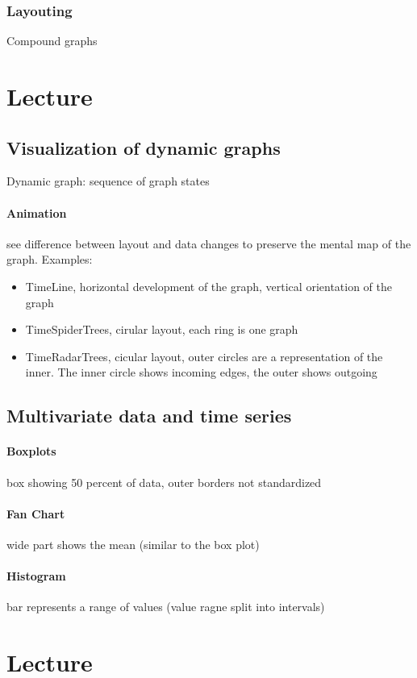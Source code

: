 \documentclass[10pt,a4paper]{article}
\begin{document}
	\subsubsection*{Layouting}
	Compound graphs
	
	\section{Lecture}
	\subsection{Visualization of dynamic graphs}
	Dynamic graph: sequence of graph states
	\paragraph{Animation} see difference between layout and data changes to preserve the mental map of the graph. Examples:
	\begin{itemize}
		\item TimeLine, horizontal development of the graph, vertical orientation of the graph  
		\item TimeSpiderTrees, cirular layout, each ring is one graph
		\item TimeRadarTrees, cicular layout, outer circles are a representation of the inner. The inner circle shows incoming edges, the outer shows outgoing
	\end{itemize}
	
	\subsection{Multivariate data and time series}
	\paragraph{Boxplots} box showing 50 percent of data, outer borders not standardized
	\paragraph{Fan Chart} wide part shows the mean (similar to the box plot) 
	\paragraph{Histogram} bar represents a range of values (value ragne split into intervals)
	
	\section{Lecture}
\end{document}
